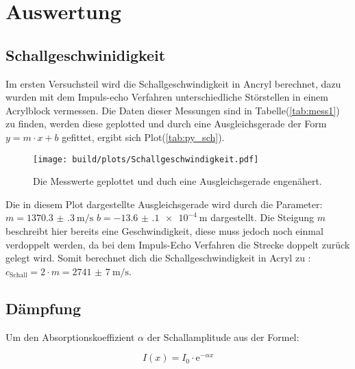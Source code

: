\section{Auswertung}

    \subsection{Schallgeschwinidigkeit}

        \noindent Im ersten Versuchsteil wird die Schallgeschwindigkeit in Ancryl berechnet, dazu wurden mit dem Impuls-echo Verfahren 
        unterschiedliche Störstellen in einem Acrylblock vermessen. Die Daten dieser Messungen sind in Tabelle(\ref{tab:mess1}) zu finden, werden 
        diese geplotted und durch eine Ausgleichsgerade der Form $y = m \cdot x + b$ gefittet, ergibt sich Plot(\ref{tab:py_sch}).

        \begin{figure}[ht]
            \centering
            \texttt{[image: build/plots/Schallgeschwindigkeit.pdf]}
            \caption{Die Messwerte geplottet und duch eine Ausgleichsgerade engenähert.}
            \label{img:py_sch}
        \end{figure}

        \noindent Die in diesem Plot dargestellte Ausgleichsgerade wird durch die Parameter: \newline
        $m = \SI{1370.3(3)}{\metre\per\second}$ \newline
        $b = \SI{-13.6(1)e-4}{\metre}$          \newline
        dargestellt. Die Steigung $m$ beschreibt hier bereits eine Geschwindigkeit, diese muss jedoch noch einmal verdoppelt werden, da bei dem 
        Impuls-Echo Verfahren die Strecke doppelt zurück gelegt wird. Somit berechnet dich die Schallgeschwindigkeit in Acryl zu : \newline
        $c_{\text{Schall}} = 2 \cdot m = \SI{2741(7)}{\metre\per\second}$.

    \subsection{Dämpfung}

        \noindent Um den Absorptionskoeffizient $\alpha$ der Schallamplitude aus der Formel:

        \begin{equation*}
            I(x) = I_0 \cdot \text{e}^{-\alpha x}
        \end{equation*}


